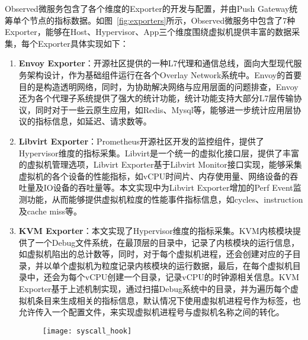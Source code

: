 Observed微服务包含了各个维度的Exporter的开发与配置，并由Push Gateway统筹单个节点的指标数据。如图~\ref{fig:exporters}所示，Observed微服务中包含了7种Exporter，能够在Host、Hypervisor、App三个维度围绕虚拟机提供丰富的数据采集，每个Exporter具体实现如下：

\begin{enumerate}

    \item \textbf{Envoy Exporter}：开源社区提供的一种L7代理和通信总线，面向大型现代服务架构设计，作为基础组件运行在各个Overlay Network系统中。Envoy的首要目的是构造透明网络，同时，为协助解决网络与应用层面的问题排查，Envoy还为各个代理子系统提供了强大的统计功能，统计功能支持大部分L7层传输协议，同时对于一些云原生应用，如Redis、Mysql等，能够进一步统计应用层协议的指标信息，如延迟、请求数等。
    
    \item \textbf{Libvirt Exporter}：Prometheus开源社区开发的监控组件，提供了Hypervisor维度的指标采集。Libvirt是一个统一的虚拟化接口层，提供了丰富的虚拟机管理选项，Libvirt Exporter基于Libvirt Monitor接口实现，能够采集虚拟机的各个设备的性能指标，如vCPU时间片、内存使用量、网络设备的吞吐量及IO设备的吞吐量等。本文实现中为Libvirt Exporter增加的Perf Event监测功能，从而能够提供虚拟机粒度的性能事件指标信息，如cycles、instruction及cache miss等。
    
    \item \textbf{KVM Exporter}：本文实现了Hypervisor维度的指标采集。KVM内核模块提供了一个Debug文件系统，在最顶层的目录中，记录了内核模块的运行信息，如虚拟机陷出的总计数等，同时，对于每个虚拟机进程，还会创建对应的子目录，并以单个虚拟机为粒度记录内核模块的运行数据，最后，在每个虚拟机目录中，还会为每个vCPU创建一个目录，记录vCPU的时钟源相关信息。KVM Exporter基于上述机制实现，通过扫描Debug系统中的目录，并为遍历每个虚拟机条目来生成相关的指标信息，默认情况下使用虚拟机进程号作为标签，也允许传入一个配置文件，来实现虚拟机进程号与虚拟机名称之间的转化。

    \begin{figure}[H]
        \centering
        \texttt{[image: syscall\_hook]}
        \label{fig:syscall_hook}
    \end{figure}


\end{enumerate}
